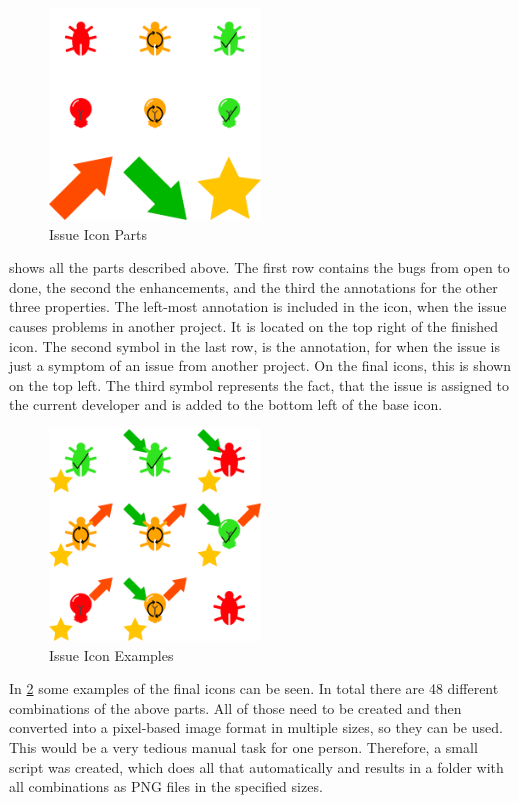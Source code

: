 \begin{figure}[!h]
	\centering
	\includegraphics[width=0.5\textwidth]{graphics/iconParts.png}
	\caption{Issue Icon Parts}
	\label{fig:c4:icon_parts}
\end{figure}
 shows all the parts described above.
The first row contains the bugs from open to done, the second the enhancements, and the third the annotations for the other three properties.
The left-most annotation is included in the icon, when the issue causes problems in another project.
It is located on the top right of the finished icon.
The second symbol in the last row, is the annotation, for when the issue is just a symptom of an issue from another project.
On the final icons, this is shown on the top left.
The third symbol represents the fact, that the issue is assigned to the current developer and is added to the bottom left of the base icon.

\begin{figure}[!h]
	\centering
	\includegraphics[width=0.5\textwidth]{graphics/iconCombinations.png}
	\caption{Issue Icon Examples}
	\label{fig:c4:icon_combinations}
\end{figure}
In \cref{fig:c4:icon_combinations} some examples of the final icons can be seen.
In total there are 48 different combinations of the above parts.
All of those need to be created and then converted into a pixel-based image format in multiple sizes, so they can be used.
This would be a very tedious manual task for one person.
Therefore, a small script was created, which does all that automatically and results in a folder with all combinations as \gls{PNG} files in the specified sizes.

